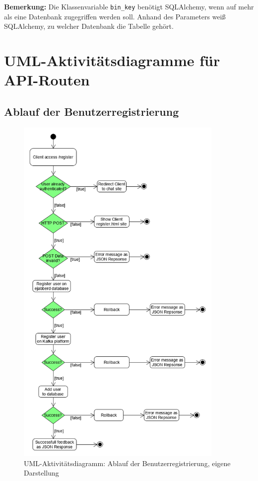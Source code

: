 \documentclass[a4paper,titlepage,halfparskip,12pt]{scrreprt}
\begin{document}
\textbf{Bemerkung:} Die Klassenvariable \texttt{bin\_key} benötigt SQLAlchemy, wenn auf mehr als eine Datenbank zugegriffen werden soll. Anhand des Parameters weiß SQLAlchemy, zu welcher Datenbank die Tabelle gehört.

\pagebreak

\chapter{\acs{UML}-Aktivitätsdiagramme für \acs{API}-Routen}

\section{Ablauf der Benutzerregistrierung}

\begin{figure}[h]
	\centering
	\includegraphics[height=17.5cm]{images/umlRegistration}
	\caption{\acs{UML}-Aktivitätsdiagramm: Ablauf der Benutzerregistrierung, eigene Darstellung}
	\label{img:umlActivityRegistration}
\end{figure}
\end{document}
